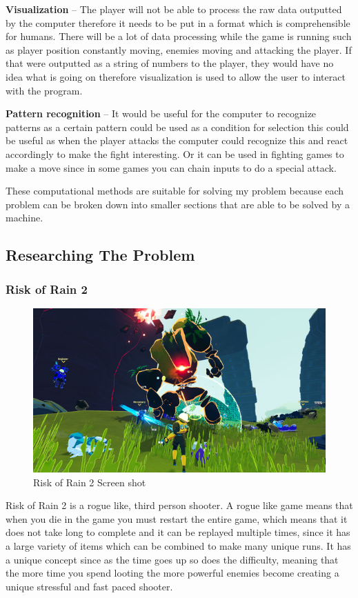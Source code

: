 \documentclass{article}
\newcommand{\parBr}{\vspace{5mm}}%
\begin{document}
\textbf{Visualization} – The player will not be able to process the raw data outputted by the computer therefore it needs to be put in a format which is comprehensible for humans. There will be a lot of data processing while the game is running such as player position constantly moving, enemies moving and attacking the player. If that were outputted as a string of numbers to the player, they would have no idea what is going on therefore visualization is used to allow the user to interact with the program.

\parBr

\textbf{Pattern recognition} – It would be useful for the computer to recognize patterns as a certain pattern could be used as a condition for selection this could be useful as when the player attacks the computer could recognize this and react accordingly to make the fight interesting. Or it can be used in fighting games to make a move since in some games you can chain inputs to do a special attack.

\parBr

These computational methods are suitable for solving my problem because each problem can be broken down into smaller sections that are able to be solved by a machine. 

\subsection{Researching The Problem}

\subsubsection{Risk of Rain 2}

\begin{figure}[h]
\includegraphics[width=\linewidth]{ROR 2 ss}
\caption{\cite{ROR2ss} Risk of Rain 2 Screen shot}
\end{figure}
Risk of Rain 2 is a rogue like, third person shooter. A rogue like game means that when you die in the game you must restart the entire game, which means that it does not take long to complete and it can be replayed multiple times, since it has a large variety of items which can be combined to make many unique runs. It has a unique concept since as the time goes up so does the difficulty, meaning that the more time you spend looting the more powerful enemies become creating a unique stressful and fast paced shooter. 
\end{document}
